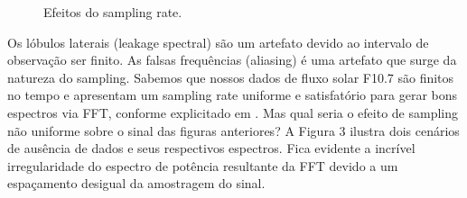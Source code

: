 \begin{figure}[ht!]
	\caption{Efeitos do sampling rate.}
	\vspace{1mm}	%
	\begin{center}
	\end{center}
	\vspace{1mm}	%
	\label{fig:sampling}
\end{figure}

Os lóbulos laterais (leakage spectral) são um artefato devido ao intervalo de observação ser finito. As falsas frequências (aliasing) é uma artefato que surge da natureza do sampling. Sabemos que nossos dados de fluxo solar F10.7 são finitos no tempo e apresentam um sampling rate uniforme e satisfatório para gerar bons espectros via FFT, conforme explicitado em . Mas qual seria o efeito de sampling não uniforme sobre o sinal das figuras anteriores? A Figura 3 ilustra dois cenários de ausência de dados e seus respectivos espectros. Fica evidente a incrível irregularidade do espectro de potência resultante da FFT devido a um espaçamento desigual da amostragem do sinal. 

